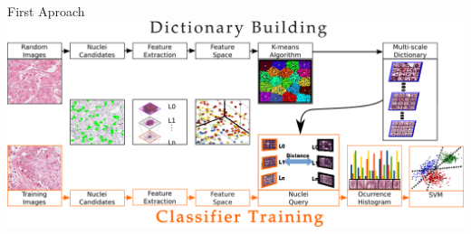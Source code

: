\documentclass[usenames,dvipsnames]{beamer}
\begin{document}
\begin{frame}{First Aproach}
\includegraphics[width=\textwidth]{imagenes/metodo_BoF.png}
\end{frame}

\end{document}
